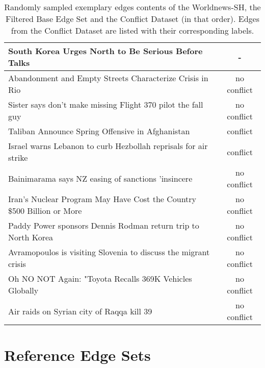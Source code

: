 \begin{table}[H]
\begin{tabular}{p{12.5cm} c}
South Korea Urges North to Be Serious Before Talks & - \\
\midrule
Abandonment and Empty Streets Characterize Crisis in Rio & no conflict \\
Sister says don't make missing Flight 370 pilot the fall guy & no conflict \\
Taliban Announce Spring Offensive in Afghanistan & conflict \\
Israel warns Lebanon to curb Hezbollah reprisals for air strike & conflict \\
Bainimarama says NZ easing of sanctions 'insincere & no conflict \\
Iran's Nuclear Program May Have Cost the Country \$500 Billion or More & no conflict \\
Paddy Power sponsors Dennis Rodman return trip to North Korea & no conflict \\
Avramopoulos is visiting Slovenia to discuss the migrant crisis & no conflict \\
Oh NO NOT Again: "Toyota Recalls 369K Vehicles Globally & no conflict \\
Air raids on Syrian city of Raqqa kill 39 & no conflict \\
\bottomrule
\end{tabular}
\caption{Randomly sampled exemplary edges contents of the Worldnews-SH, the Filtered Base Edge Set and the Conflict Dataset (in that order). Edges from the Conflict Dataset are listed with their corresponding labels.}
\label{tab:example-edges}
\end{table}



\section{Reference Edge Sets}
\label{app-sec:ref-edge-sets}


